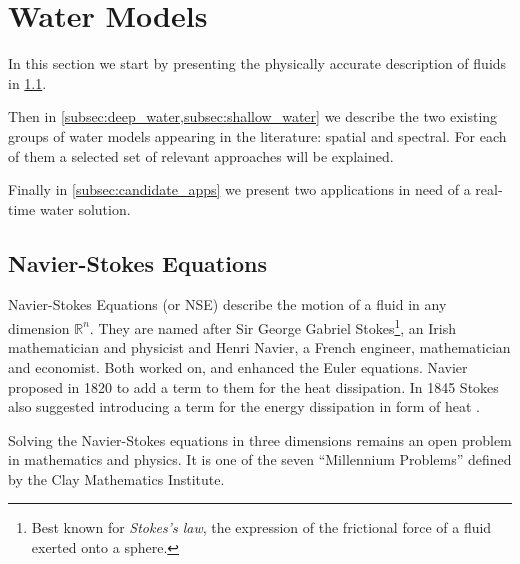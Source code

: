 \section{Water Models}\label{sec:water_models}



In this section we start by presenting the physically accurate description of
fluids in \cref{subsec:navier_stokes}.

Then in
\cref{subsec:deep_water,subsec:shallow_water} we describe the two existing
groups of water models appearing in the literature: spatial and spectral. For
each of them a selected set of relevant approaches will be explained.

Finally in \autoref{subsec:candidate_apps} we present two applications in need
of a real-time water solution.

\subsection{Navier-Stokes Equations}\label{subsec:navier_stokes}


Navier-Stokes Equations (or NSE) describe the motion of a fluid in any dimension
$\mathbb{R}^n$. They are named after Sir George Gabriel Stokes\footnote{Best
known for \textit{Stokes's law}, the expression of the frictional force of a
fluid exerted onto a sphere.}, an Irish mathematician and physicist and Henri
Navier, a French engineer, mathematician and economist. Both worked on, and
enhanced the Euler equations. Navier proposed in 1820 to add a term to them for
the heat dissipation. In 1845 Stokes also suggested introducing a term for the
energy dissipation in form of heat \autocite{gallagher2010autour}.

Solving the Navier-Stokes equations in three dimensions remains an open problem
in mathematics and physics. It is one of the seven ``Millennium Problems''
defined by the Clay Mathematics Institute.

